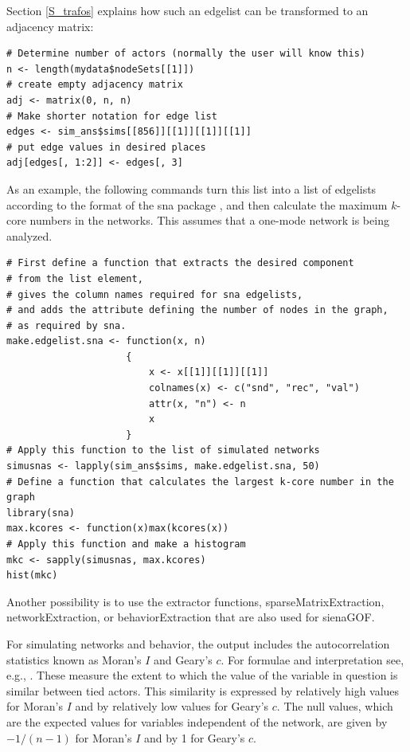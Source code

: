 \documentclass[a4paper,fleqn,11pt]{article}
\newcommand{\+}{\, + \,}
\newcommand{\sfn}[1]{\textsf{#1}}
\begin{document}
Section \ref{S_trafos} explains how such an edgelist can be
transformed to an adjacency matrix:
\begin{verbatim}
# Determine number of actors (normally the user will know this)
n <- length(mydata$nodeSets[[1]])
# create empty adjacency matrix
adj <- matrix(0, n, n)
# Make shorter notation for edge list
edges <- sim_ans$sims[[856]][[1]][[1]][[1]]
# put edge values in desired places
adj[edges[, 1:2]] <- edges[, 3]
\end{verbatim}

As an example, the following commands turn this list into
a list of edgelists according to the format of the \textsf{sna} package
\citep{Butts08}, and then calculate the maximum $k$-core numbers
in the networks.
This assumes that a one-mode network is being analyzed.
\begin{verbatim}
# First define a function that extracts the desired component
# from the list element,
# gives the column names required for sna edgelists,
# and adds the attribute defining the number of nodes in the graph,
# as required by sna.
make.edgelist.sna <- function(x, n)
                     {
                         x <- x[[1]][[1]][[1]]
                         colnames(x) <- c("snd", "rec", "val")
                         attr(x, "n") <- n
                         x
                     }
# Apply this function to the list of simulated networks
simusnas <- lapply(sim_ans$sims, make.edgelist.sna, 50)
# Define a function that calculates the largest k-core number in the graph
library(sna)
max.kcores <- function(x)max(kcores(x))
# Apply this function and make a histogram
mkc <- sapply(simusnas, max.kcores)
hist(mkc)
\end{verbatim}
\bigskip

Another possibility is to use the extractor functions,
\sfn{sparseMatrixExtraction}, \sfn{networkExtraction}, or \sfn{behaviorExtraction}
that are also used for \sfn{sienaGOF}.


\iffalse
For simulating networks and behavior, the output includes
the autocorrelation statistics known as Moran's $I$ and Geary's $c$.
For formulae and interpretation see, e.g., \citet[98--99]{Ripley81}.
These measure the extent to which the value of the variable
in question is similar between tied actors.
This similarity is expressed by relatively high values for Moran's $I$
and by relatively low values for Geary's $c$.
The null values, which are the expected values for variables
independent of the network, are given by $-1/(n-1)$ for Moran's $I$
and by 1 for Geary's $c$.
\end{document}
